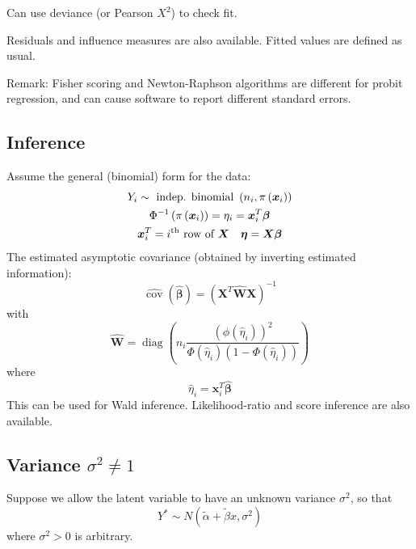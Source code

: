 \documentclass[11pt]{elegantbook}
\begin{document}
Can use deviance (or Pearson $X^2$) to check fit.

Residuals and influence measures are also available. Fitted values are defined as usual.

Remark: Fisher scoring and Newton-Raphson algorithms are different for probit regression, and can cause software to report different standard errors.

\subsection{Inference}
Assume the general (binomial) form for the data:
$$
\begin{gathered}
Y_i \sim \text { indep. binomial }\left(n_i, \pi\left(\boldsymbol{x}_i\right)\right) \\
\Phi^{-1}\left(\pi\left(\boldsymbol{x}_i\right)\right)=\eta_i=\boldsymbol{x}_i^T \boldsymbol{\beta} \\
\boldsymbol{x}_i^T=i^\textnormal{th} \text { row of } \boldsymbol{X} \quad \boldsymbol{\eta}=\boldsymbol{X} \boldsymbol{\beta}
\end{gathered}
$$
The estimated asymptotic covariance (obtained by inverting estimated information):
$$
\widehat{\operatorname{cov}}(\hat{\boldsymbol{\beta}})=\left(\boldsymbol{X}^T \hat{\boldsymbol{W}} \boldsymbol{X}\right)^{-1}
$$
with
$$
\hat{\boldsymbol{W}}=\operatorname{diag}\left(n_i \frac{\left(\phi\left(\hat{\eta}_i\right)\right)^2}{\Phi\left(\hat{\eta}_i\right)\left(1-\Phi\left(\hat{\eta}_i\right)\right)}\right)
$$
where
$$
\hat{\eta}_i=\boldsymbol{x}_i^T \hat{\boldsymbol{\beta}}
$$
This can be used for Wald inference. Likelihood-ratio and score inference are also available.

\subsection{Variance $\sigma^2\neq 1$}
Suppose we allow the latent variable to have an unknown variance $\sigma^2$, so that
$$
Y^* \sim N\left(\tilde{\alpha}+\tilde{\beta} x, \sigma^2\right)
$$
where $\sigma^2>0$ is arbitrary.
\end{document}
